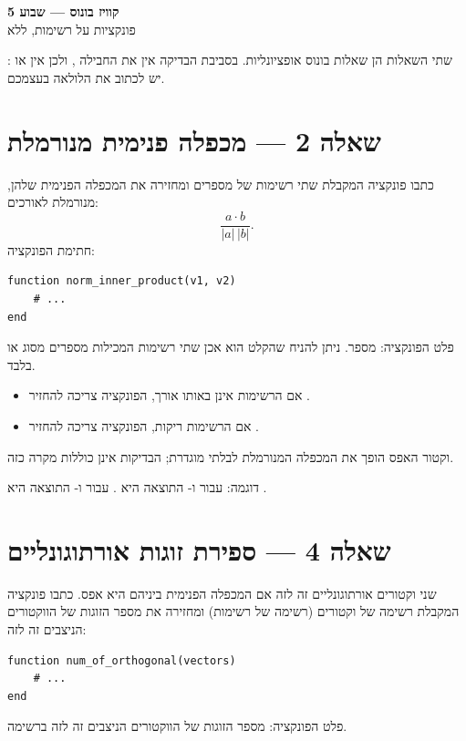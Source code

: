 \documentclass[11pt]{article}
\begin{document}
\begin{center}
{\LARGE\sffamily\bfseries\color{deepblue} קוויז בונוס --- שבוע 5}\\[.2cm]
{\large פונקציות על רשימות, ללא }
\end{center}

\noindent שתי השאלות הן שאלות בונוס אופציונליות. בסביבת הבדיקה אין את החבילה
, ולכן אין  או :
יש לכתוב את הלולאה בעצמכם.

\section*{שאלה 2 --- מכפלה פנימית מנורמלת}
כתבו פונקציה המקבלת שתי רשימות של מספרים ומחזירה את המכפלה הפנימית שלהן,
מנורמלת לאורכים:
\[
\frac{a\cdot b}{|a|\,|b|}.
\]
חתימת הפונקציה:
\begin{latin}
\begin{lstlisting}
function norm_inner_product(v1, v2)
    # ...
end
\end{lstlisting}
\end{latin}
פלט הפונקציה: מספר. ניתן להניח שהקלט הוא אכן שתי רשימות המכילות מספרים מסוג
 או  בלבד.
\begin{itemize}
\item אם הרשימות אינן באותו אורך, הפונקציה צריכה להחזיר .
\item אם הרשימות ריקות, הפונקציה צריכה להחזיר .
\end{itemize}
וקטור האפס הופך את המכפלה המנורמלת לבלתי מוגדרת; הבדיקות אינן כוללות מקרה כזה.

דוגמה: עבור  ו- התוצאה
היא . עבור \eng{\texttt{[1.0, 0.0]}} ו-\eng{\texttt{[0.0, 1.0]}}
התוצאה היא .

\section*{שאלה 4 --- ספירת זוגות אורתוגונליים}
שני וקטורים אורתוגונליים זה לזה אם המכפלה הפנימית ביניהם היא אפס. כתבו פונקציה
המקבלת רשימה של וקטורים (רשימה של רשימות) ומחזירה את מספר הזוגות של הווקטורים
הניצבים זה לזה:
\begin{latin}
\begin{lstlisting}
function num_of_orthogonal(vectors)
    # ...
end
\end{lstlisting}
\end{latin}
פלט הפונקציה: מספר הזוגות של הווקטורים הניצבים זה לזה ברשימה.
\end{document}
